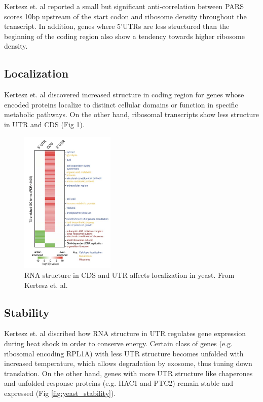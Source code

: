 \documentclass{proposal}
\begin{document}
Kertesz et. al\cite{kertesz2010genome} reported a small but significant anti-correlation between PARS scores 10bp upstream
of the start codon and ribosome density throughout the transcript.
In addition, genes where 5'UTRs are less structured than the beginning of the coding region also show a tendency towards higher ribosome density.

\subsection*{Localization}

Kertesz et. al\cite{kertesz2010genome} discovered increased structure in coding region for genes
whose encoded proteins localize to distinct cellular domains or function in specific metabolic pathways.
On the other hand, ribosomal transcripts show less structure in UTR and CDS (Fig \ref{fig:yeast_localization}).



\begin{figure}[h!]
    \centering
    \includegraphics[width=0.4\textwidth]{yeast_localization.png}
    \caption{RNA structure in CDS and UTR affects localization in yeast. From Kertesz et. al\cite{kertesz2010genome}.}
    \label{fig:yeast_localization}
    \centering
\end{figure}



\subsection*{Stability}


Kertesz et. al\cite{kertesz2010genome} discribed how RNA structure in UTR regulates gene expression during heat shock in order to conserve energy.
Certain class of genes (e.g. ribosomal encoding ﻿RPL1A) with less UTR structure becomes unfolded with increased temperature,
which allows degradation by exosome, thus tuning down translation.
On the other hand, genes with more UTR structure like ﻿chaperones and unfolded response proteins (e.g. HAC1 and PTC2) remain stable and expressed (Fig \ref{fig:yeast_stability}).
\end{document}
